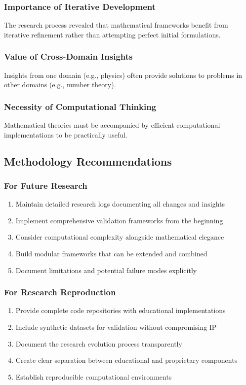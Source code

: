 \documentclass[12pt]{article}
\begin{document}
\subsubsection{Importance of Iterative Development}
The research process revealed that mathematical frameworks benefit from iterative refinement rather than attempting perfect initial formulations.

\subsubsection{Value of Cross-Domain Insights}
Insights from one domain (e.g., physics) often provide solutions to problems in other domains (e.g., number theory).

\subsubsection{Necessity of Computational Thinking}
Mathematical theories must be accompanied by efficient computational implementations to be practically useful.

\subsection{Methodology Recommendations}

\subsubsection{For Future Research}
\begin{enumerate}
    \item Maintain detailed research logs documenting all changes and insights
    \item Implement comprehensive validation frameworks from the beginning
    \item Consider computational complexity alongside mathematical elegance
    \item Build modular frameworks that can be extended and combined
    \item Document limitations and potential failure modes explicitly
\end{enumerate}

\subsubsection{For Research Reproduction}
\begin{enumerate}
    \item Provide complete code repositories with educational implementations
    \item Include synthetic datasets for validation without compromising IP
    \item Document the research evolution process transparently
    \item Create clear separation between educational and proprietary components
    \item Establish reproducible computational environments
\end{enumerate}
\end{document}
